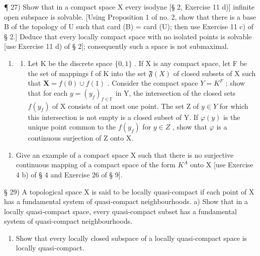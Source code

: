 ¶ 27) Show that in a compact space X every isodyne {[}§ 2, Exercise 11 d){]} infinite open subspace is solvable. {[}Using Proposition 1 of no. 2, show that there is a base B of the topology of U such that card (B) = card (U); then use Exercise 11 c) of § 2.{]} Deduce that every locally compact space with no isolated points is solvable {[}use Exercise 11 d) of § 2{]}; consequently such a space is not submaximal.

\begin{enumerate}
\def\labelenumi{\arabic{enumi})}
\setcounter{enumi}{27}
\tightlist
\item
  \begin{enumerate}
  \def\labelenumii{\alph{enumii})}
  \tightlist
  \item
    Let K be the discrete space \(\{0,1\}\) . If X is any compact space, let F be the set of mappings f of K into the set \(\mathfrak{F}(X)\) of closed subsets of X such that \(\mathbf{X}=f(0)\cup f(1)\) . Consider the compact space \(Y=K^{F}\) ; show that for each \(y=(y_{f})_{f\in\mathbb{F}}\) in Y, the intersection of the closed sets \(f(y_{f})\) of X consists of at most one point. The set Z of \(y\in Y\) for which this intersection is not empty is a closed subset of Y. If \(\varphi(y)\) is the unique point common to the \(f(y_{f})\) for \(y\in Z\) , show that \(\varphi\) is a continuous surjection of Z onto X.
  \end{enumerate}
\end{enumerate}

\begin{enumerate}
\def\labelenumi{\alph{enumi})}
\setcounter{enumi}{1}
\tightlist
\item
  Give an example of a compact space X such that there is no surjective continuous mapping of a compact space of the form \(K^{A}\) onto X {[}use Exercise 4 b) of § 4 and Exercise 26 of § 9{]}.
\end{enumerate}

§ 29) A topological space X is said to be locally quasi-compact if each point of X has a fundamental system of quasi-compact neighbourhoods. a) Show that in a locally quasi-compact space, every quasi-compact subset has a fundamental system of quasi-compact neighbourhoods.

\begin{enumerate}
\def\labelenumi{\alph{enumi})}
\setcounter{enumi}{1}
\tightlist
\item
  Show that every locally closed subspace of a locally quasi-compact space is locally quasi-compact.
\end{enumerate}

